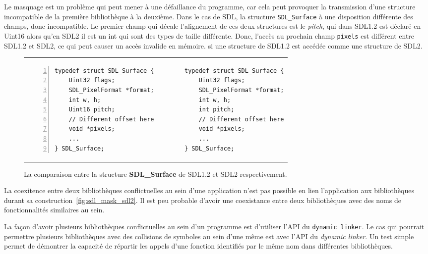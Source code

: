 Le masquage est un problème qui peut mener à une défaillance du
programme, car cela peut provoquer la transmission d'une structure incompatible
de la première bibliothèque à la deuxième. Dans le cas de SDL, la structure
\verb+SDL_Surface+ à une disposition différente des champs, donc incompatible.
Le premier champ qui décale l'alignement de ces deux structures est le
\textit{pitch}, qui dans SDL1.2 est déclaré en Uint16 alors qu'en SDL2 il est
un int qui sont des types de taille différente. Donc, l'accès au prochain champ
\texttt{pixels} est différent entre SDL1.2 et SDL2, ce qui peut causer un accès
invalide en mémoire. si une structure de SDL1.2 est accédée comme une structure
de SDL2.


\begin{figure}[h]
  \centering
\begin{tabular}{p{18em}p{18em}}
\begin{lstlisting}[frame=single,numbers=left]
typedef struct SDL_Surface {
    Uint32 flags;
    SDL_PixelFormat *format;
    int w, h;
    Uint16 pitch;
    // Different offset here
    void *pixels;
    ...
} SDL_Surface;
\end{lstlisting}&
\begin{lstlisting}[frame=single,numbers=right]
typedef struct SDL_Surface {
    Uint32 flags;
    SDL_PixelFormat *format;
    int w, h;
    int pitch;
    // Different offset here
    void *pixels;
    ...
} SDL_Surface;
\end{lstlisting}\\
\end{tabular}
  \caption{La comparaison entre la structure \textbf{SDL\_Surface} de SDL1.2 et SDL2 respectivement.}
  \label{fig:sdl_surface}
\end{figure}


La coexitence entre deux bibliothèques conflictuelles au sein d'une application
n'est pas possible en lien l'application aux bibliothèques durant sa
construction~\ref{fig:sdl_mask_sdl2}.  Il est peu probable d'avoir une
coexistance entre deux bibliothèques avec des noms de fonctionnalités
similaires au sein.

La façon d'avoir plusieurs bibliothèques conflictuelles au sein d'un programme
est d'utiliser l'API du \texttt{dynamic linker}.  Le cas qui pourrait permettre
plusieurs bibliothèques avec des collisions de symboles au sein d'une même est
avec l'API du \textit{dynamic linker}. Un test simple permet de démontrer la
capacité de répartir les appels d'une fonction identifiés par le même nom dans
différentes bibliothèques.

